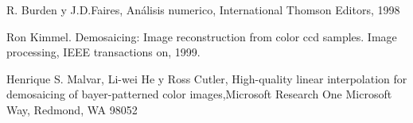 \begin{thebibliography}{9}

  R. Burden y J.D.Faires, Análisis numerico, International Thomson Editors, 1998

Ron Kimmel. Demosaicing: Image reconstruction from color ccd samples. Image processing, IEEE transactions on, 1999.

Henrique S. Malvar, Li-wei He y Ross Cutler, High-quality linear interpolation for demosaicing of bayer-patterned color images,Microsoft Research One Microsoft Way, Redmond, WA 98052

\end{thebibliography}
